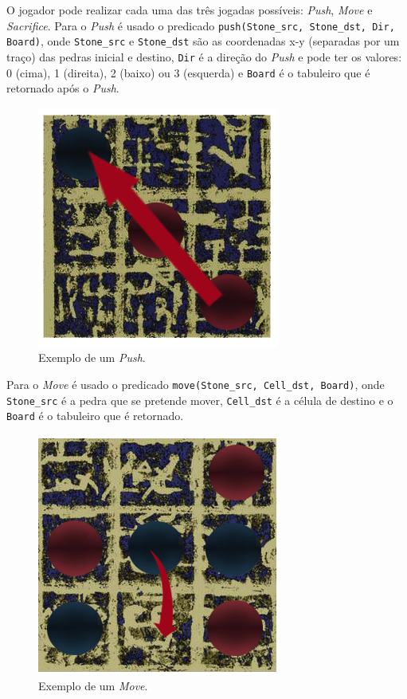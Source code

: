 \documentclass[a4paper]{article}
\begin{document}
O jogador pode realizar cada uma das três jogadas possíveis: \textit{Push}, \textit{Move} e \textit{Sacrifice}. Para o \textit{Push} é usado o predicado \texttt{push(Stone\_src, Stone\_dst, Dir, Board)}, onde \texttt{Stone\_src} e \texttt{Stone\_dst} são as coordenadas x-y (separadas por um traço) das pedras inicial e destino, \texttt{Dir} é a direção do \textit{Push} e pode ter os valores: 0 (cima), 1 (direita), 2 (baixo) ou 3 (esquerda) e \texttt{Board} é o tabuleiro que é retornado após o \textit{Push}.

\begin{figure}[!htb]
	\centering
	\includegraphics[scale=0.2]{images/push.png}
	\caption{Exemplo de um \textit{Push}.}
\end{figure}

\newpage

Para o \textit{Move} é usado o predicado \texttt{move(Stone\_src, Cell\_dst, Board)}, onde \texttt{Stone\_src} é a pedra que se pretende mover, \texttt{Cell\_dst} é a célula de destino e o \texttt{Board} é o tabuleiro que é retornado.

\begin{figure}[!htb]
	\centering
	\includegraphics[scale=0.3]{images/move.png}
	\caption{Exemplo de um \textit{Move}.}
\end{figure}
\end{document}
